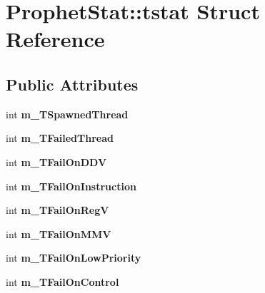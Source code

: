 \hypertarget{structProphetStat_1_1tstat}{
\section{ProphetStat::tstat Struct Reference}
\label{structProphetStat_1_1tstat}
}
\subsection*{Public Attributes}
\begin{DoxyCompactItemize}
\item 
\hypertarget{structProphetStat_1_1tstat_a694ce1d906f707d011c2205739cbdf69}{
int {\bfseries m\_\-TSpawnedThread}}
\label{structProphetStat_1_1tstat_a694ce1d906f707d011c2205739cbdf69}

\item 
\hypertarget{structProphetStat_1_1tstat_afa7b7f1e0601ac262fa1f835a4e0e1d8}{
int {\bfseries m\_\-TFailedThread}}
\label{structProphetStat_1_1tstat_afa7b7f1e0601ac262fa1f835a4e0e1d8}

\item 
\hypertarget{structProphetStat_1_1tstat_a907931fb44b2913b38e4aa68fe5b05c5}{
int {\bfseries m\_\-TFailOnDDV}}
\label{structProphetStat_1_1tstat_a907931fb44b2913b38e4aa68fe5b05c5}

\item 
\hypertarget{structProphetStat_1_1tstat_abf1b5569e8f82646eefc90245d603345}{
int {\bfseries m\_\-TFailOnInstruction}}
\label{structProphetStat_1_1tstat_abf1b5569e8f82646eefc90245d603345}

\item 
\hypertarget{structProphetStat_1_1tstat_a729cd10397d6da6e409cf759960693e3}{
int {\bfseries m\_\-TFailOnRegV}}
\label{structProphetStat_1_1tstat_a729cd10397d6da6e409cf759960693e3}

\item 
\hypertarget{structProphetStat_1_1tstat_a3418de332f65500d0654faf296862842}{
int {\bfseries m\_\-TFailOnMMV}}
\label{structProphetStat_1_1tstat_a3418de332f65500d0654faf296862842}

\item 
\hypertarget{structProphetStat_1_1tstat_a47460711eec4436ee27b783b37256a6d}{
int {\bfseries m\_\-TFailOnLowPriority}}
\label{structProphetStat_1_1tstat_a47460711eec4436ee27b783b37256a6d}

\item 
\hypertarget{structProphetStat_1_1tstat_a5e3f752e3f8f6f15e489b9f1e6a4c5eb}{
int {\bfseries m\_\-TFailOnControl}}
\label{structProphetStat_1_1tstat_a5e3f752e3f8f6f15e489b9f1e6a4c5eb}


\end{DoxyCompactItemize}
